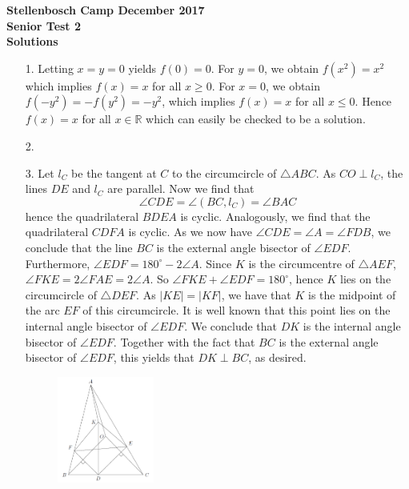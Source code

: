 \documentclass[a4paper, 12pt]{article}
\begin{document}
\begin{center}
\textbf{Stellenbosch Camp December 2017 \\ Senior Test 2} \\
\textbf{Solutions}
\end{center}

\begin{enumerate}

    \item[1.] Letting $x = y = 0$ yields $f(0) = 0$. For $y = 0$, we obtain $f(x^2) = x^2$ which implies $f(x) = x$ for all $x \geq 0$. For $x = 0$, we obtain $f(-y^2) = -f(y^2) = -y^2$, which implies $f(x) = x$ for all $x \leq 0$. Hence $f(x) = x$ for all $x \in \mathbb{R}$ which can easily be checked to be a solution.
    
    \item[2.] 
    
    \item[3.] Let $l_C$ be the tangent at $C$ to the circumcircle of $\triangle ABC$. As $CO \perp l_C$, the lines $DE$ and $l_C$ are parallel. Now we find that
    $$ \angle CDE = \angle (BC, l_C) = \angle BAC $$
    hence the quadrilateral $BDEA$ is cyclic. Analogously, we find that the quadrilateral $CDFA$ is cyclic. As we now have $\angle CDE = \angle A = \angle FDB$, we conclude that the line $BC$ is the external angle bisector of $\angle EDF$. Furthermore, $\angle EDF = 180^\circ - 2 \angle A$. Since $K$ is the circumcentre of $\triangle AEF$, $\angle FKE = 2 \angle FAE = 2 \angle A$. So $\angle FKE + \angle EDF = 180^\circ$, hence $K$ lies on the circumcircle of $\triangle DEF$. As $|KE| = |KF|$, we have that $K$ is the midpoint of the arc $EF$ of this circumcircle. It is well known that this point lies on the internal angle bisector of $\angle EDF$. We conclude that $DK$ is the internal angle bisector of $\angle EDF$. Together with the fact that $BC$ is the external angle bisector of $\angle EDF$, this yields that $DK \perp BC$, as desired.
    
    \begin{figure}[h!]
        \centering
        \includegraphics[width=0.3\textwidth]{seniortest2_q3.PNG}
    \end{figure}
    

\end{enumerate}
\end{document}
